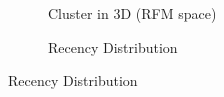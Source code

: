 \begin{figure}[h]
	\centering
	\begin{subfigure}[t]{0.48\textwidth}
		\centering
		\caption{Cluster in 3D (RFM space)}
	\end{subfigure}
	\hfill
	\begin{subfigure}[t]{0.48\textwidth}
		\centering
		\caption{Recency Distribution}
	\end{subfigure}
	

\end{figure}
